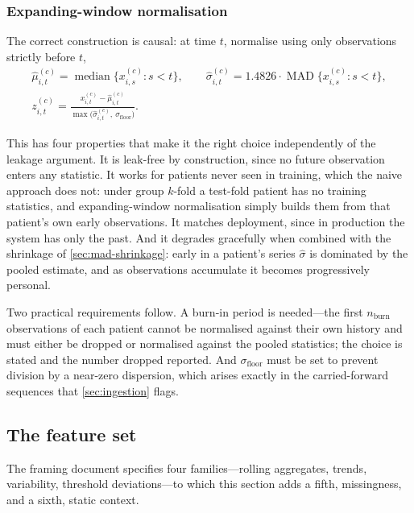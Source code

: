 \documentclass[12pt,a4paper,oneside]{report}
\begin{document}
\subsubsection{Expanding-window normalisation}\label{sec:expanding}

The correct construction is causal: at time $t$, normalise using only observations strictly before $t$,
\begin{gather}
  \hat\mu^{(c)}_{i,t} = \operatorname{median}\bigl\{x^{(c)}_{i,s} : s < t\bigr\},
  \qquad
  \hat\sigma^{(c)}_{i,t} = 1.4826\cdot\operatorname{MAD}\bigl\{x^{(c)}_{i,s} : s < t\bigr\},\\
  z^{(c)}_{i,t} = \frac{x^{(c)}_{i,t} - \hat\mu^{(c)}_{i,t}}
                       {\max\bigl(\hat\sigma^{(c)}_{i,t},\ \sigma_{\text{floor}}\bigr)}.
\end{gather}

This has four properties that make it the right choice independently of the leakage argument. It is leak-free by construction, since no future observation enters any statistic. It works for patients never seen in training, which the naive approach does not: under group $k$-fold a test-fold patient has no training statistics, and expanding-window normalisation simply builds them from that patient's own early observations. It matches deployment, since in production the system has only the past. And it degrades gracefully when combined with the shrinkage of \cref{sec:mad-shrinkage}: early in a patient's series $\hat\sigma$ is dominated by the pooled estimate, and as observations accumulate it becomes progressively personal.

Two practical requirements follow. A burn-in period is needed---the first $n_{\text{burn}}$ observations of each patient cannot be normalised against their own history and must either be dropped or normalised against the pooled statistics; the choice is stated and the number dropped reported. And $\sigma_{\text{floor}}$ must be set to prevent division by a near-zero dispersion, which arises exactly in the carried-forward sequences that \cref{sec:ingestion} flags.

\subsection{The feature set}\label{sec:features}

The framing document specifies four families---rolling aggregates, trends, variability, threshold deviations---to which this section adds a fifth, missingness, and a sixth, static context.
\end{document}
